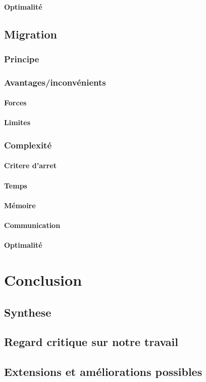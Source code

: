 \documentclass[a4paper, 10pt]{article}
\begin{document}
\paragraph{Optimalité}

\subsection{Migration}

\subsubsection{Principe}

\subsubsection{Avantages/inconvénients}

\paragraph{Forces}

\paragraph{Limites}

\subsubsection{Complexité}

\paragraph{Critere d'arret}

\paragraph{Temps}

\paragraph{Mémoire}

\paragraph{Communication}

\paragraph{Optimalité}

\newpage
\section{Conclusion}

\subsection{Synthese}

\subsection{Regard critique sur notre travail}

\subsection{Extensions et améliorations possibles}
\end{document}
